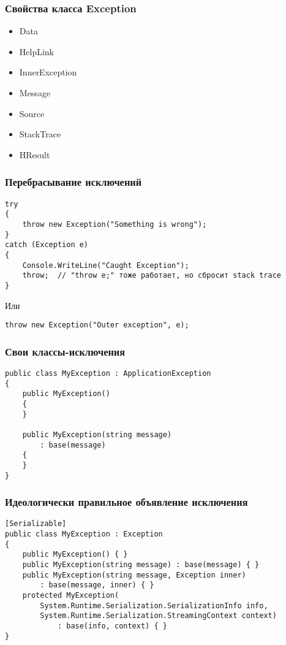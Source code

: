 \documentclass[xetex,mathserif,serif]{beamer}
\begin{document}
	\begin{frame}[fragile]
		\frametitle{Свойства класса Exception}
		\begin{itemize}
			\item Data
			\item HelpLink
			\item InnerException
			\item Message
			\item Source
			\item StackTrace
			\item HResult
		\end{itemize}
	\end{frame}

	\begin{frame}[fragile]
		\frametitle{Перебрасывание исключений}
		\begin{verbatim}
try
{
    throw new Exception("Something is wrong");
}
catch (Exception e)
{
    Console.WriteLine("Caught Exception");
    throw;  // "throw e;" тоже работает, но сбросит stack trace
}
		\end{verbatim}

		Или
		\begin{verbatim}
throw new Exception("Outer exception", e);
		\end{verbatim}
	\end{frame}

	\begin{frame}[fragile]
		\frametitle{Свои классы-исключения}
		\begin{verbatim}
public class MyException : ApplicationException
{
    public MyException() 
    {
    }

    public MyException(string message)
        : base(message)
    {
    }
}
		\end{verbatim}
	\end{frame}

	\begin{frame}[fragile]
		\frametitle{Идеологически правильное объявление исключения}
		\begin{verbatim}
[Serializable]
public class MyException : Exception
{
    public MyException() { }
    public MyException(string message) : base(message) { }
    public MyException(string message, Exception inner) 
        : base(message, inner) { }
    protected MyException(
        System.Runtime.Serialization.SerializationInfo info,
        System.Runtime.Serialization.StreamingContext context)
            : base(info, context) { }
}
		\end{verbatim}
	\end{frame}
\end{document}
